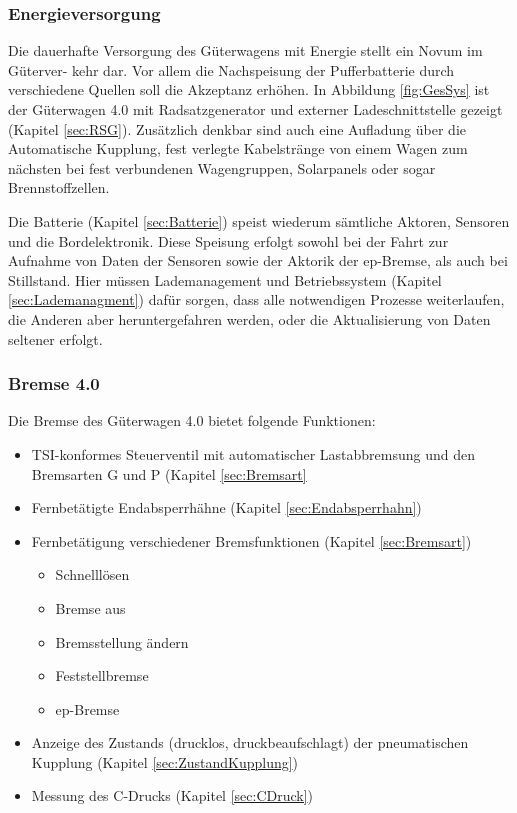 \subsubsection{Energieversorgung}
Die dauerhafte Versorgung des Güterwagens mit Energie stellt ein Novum im Güterver- kehr dar. Vor allem die Nachspeisung der Pufferbatterie durch verschiedene Quellen soll die Akzeptanz erhöhen. In Abbildung \ref{fig:GesSys} ist der Güterwagen 4.0 mit Radsatzgenerator und externer Ladeschnittstelle gezeigt (Kapitel \ref{sec:RSG}). Zusätzlich denkbar sind auch eine Aufladung über die Automatische Kupplung, fest verlegte Kabelstränge von einem Wagen zum nächsten bei fest verbundenen Wagengruppen, Solarpanels oder sogar Brennstoffzellen. %
\par
Die Batterie (Kapitel \ref{sec:Batterie}) speist wiederum sämtliche Aktoren, Sensoren und die Bordelektronik. Diese Speisung erfolgt sowohl bei der Fahrt zur Aufnahme von Daten der Sensoren sowie der Aktorik der ep-Bremse, als auch bei Stillstand. Hier müssen Lademanagement und Betriebssystem (Kapitel \ref{sec:Lademanagment}) dafür sorgen, dass alle notwendigen Prozesse weiterlaufen, die Anderen aber heruntergefahren werden, oder die Aktualisierung von Daten seltener erfolgt.


\subsubsection{Bremse 4.0}
Die Bremse des Güterwagen 4.0 bietet folgende Funktionen:
\begin{itemize}
    \item TSI-konformes Steuerventil mit automatischer Lastabbremsung und den \gls{Bremsart}en G und P (Kapitel \ref{sec:Bremsart}
    \item Fernbetätigte Endabsperrhähne (Kapitel \ref{sec:Endabsperrhahn})
    \item Fernbetätigung verschiedener Bremsfunktionen  (Kapitel \ref{sec:Bremsart})
    \begin{itemize}
        \item Schnelllösen
        \item Bremse aus
        \item Bremsstellung ändern
        \item Feststellbremse
        \item ep-Bremse
    \end{itemize}
    \item Anzeige des Zustands (drucklos, druckbeaufschlagt) der pneumatischen Kupplung (Kapitel \ref{sec:ZustandKupplung})
    \item Messung des C-Drucks (Kapitel \ref{sec:CDruck})
\end{itemize}

